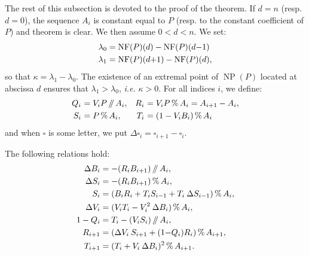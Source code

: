 \documentclass{sig-alternate-05-2015}
\DeclareMathOperator{\NP}{NP}
\newcommand{\NF}{\text{\rm NF}}
\renewcommand{\mod}{\,\%\,}
\renewcommand{\div}{\,/\hspace{-0.3em}/\,}
\begin{document}
The rest of this subsection is devoted to the proof of the theorem.
If $d = n$ (resp. $d = 0$), the sequence $A_i$ is constant equal to
$P$ (resp. to the constant coefficient of $P$) and theorem is clear.
We then assume $0 < d < n$. We set:
\begin{align*}
\lambda_0 & = \NF(P)(d) - \NF(P)(d{-}1) \\
\lambda_1 & = \NF(P)(d{+}1) - \NF(P)(d),
\end{align*}
so that $\kappa = \lambda_1 - \lambda_0$.
The existence of an extremal point of $\NP(P)$ located at abscissa
$d$ ensures that $\lambda_1 > \lambda_0$, \emph{i.e.} $\kappa > 0$.
For all indices $i$, we define:
$$\begin{array}{r@{\,\,}lr@{\,\,}l}
Q_i &= V_i P \div A_i, &
R_i & = V_i P \mod A_i = A_{i+1} - A_i, 
\smallskip \\
S_i &= P \mod A_i, &
T_i &= (1 - V_i B_i) \mod A_i
\end{array}$$
and when $\square$ is some letter, we put $\Delta \square_i = \square_{i+1} 
- \square_i$.

\begin{lem} \label{lem:formulae}
The following relations hold:
\begin{align}
\Delta B_i &= -(R_i B_{i+1}) \div A_i, \label{eqdef:Biminus} \\
\Delta S_i &= -(R_i B_{i+1}) \mod A_i,  \label{eqdef:Siminus} \\
S_{i} &= (B_i R_i + T_i S_{i-1} + T_i \: \Delta S_{i-1}) \mod A_{i}, \label{eqdef:Si2}  \\
\Delta V_i &= (V_i T_i - V_i^2 \: \Delta B_i) \mod A_{i}, \label{eqdef:Viminus}\\
1-Q_i &= T_i - (V_i S_i) \div A_i, \label{eqdef:Qiminus}\\
R_{i+1} &= (\Delta V_i \: S_{i+1}+(1{-}Q_i)R_i) \mod A_{i+1}, \label{eq:Riplus}\\
T_{i+1} &= (T_i + V_i \: \Delta B_i)^2 \mod{A_{i+1}}. \label{eq:ViBiplus}
\end{align}
\end{lem}
\end{document}
